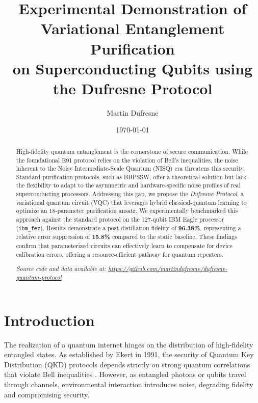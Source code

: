 \documentclass[twocolumn,aps,prl,superscriptaddress]{revtex4-2}
\begin{document}
\title{Experimental Demonstration of Variational Entanglement Purification \\ on Superconducting Qubits using the Dufresne Protocol}

\author{Martin Dufresne}

\date{\today}

\begin{abstract}
High-fidelity quantum entanglement is the cornerstone of secure communication. While the foundational E91 protocol relies on the violation of Bell's inequalities, the noise inherent to the Noisy Intermediate-Scale Quantum (NISQ) era threatens this security. Standard purification protocols, such as BBPSSW, offer a theoretical solution but lack the flexibility to adapt to the asymmetric and hardware-specific noise profiles of real superconducting processors. 
Addressing this gap, we propose the \textit{Dufresne Protocol}, a variational quantum circuit (VQC) that leverages hybrid classical-quantum learning to optimize an 18-parameter purification ansatz. We experimentally benchmarked this approach against the standard protocol on the 127-qubit IBM Eagle processor (\texttt{ibm\_fez}). Results demonstrate a post-distillation fidelity of \textbf{96.38\%}, representing a relative error suppression of \textbf{15.8\%} compared to the static baseline. These findings confirm that parameterized circuits can effectively learn to compensate for device calibration errors, offering a resource-efficient pathway for quantum repeaters.

\vspace{0.5cm}
\noindent \textit{Source code and data available at: \url{https://github.com/martindufresne/dufresne-quantum-protocol}}
\end{abstract}

\maketitle

\section{Introduction}

The realization of a quantum internet hinges on the distribution of high-fidelity entangled states. As established by Ekert in 1991, the security of Quantum Key Distribution (QKD) protocols depends strictly on strong quantum correlations that violate Bell inequalities \cite{ekert91}. However, as entangled photons or qubits travel through channels, environmental interaction introduces noise, degrading fidelity and compromising security.
\end{document}
